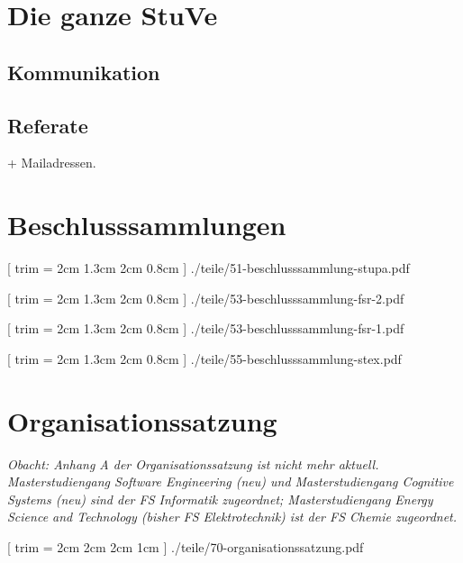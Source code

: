 \documentclass[
	10pt,
	a5paper,
	twoside
	]
	{book}
\begin{document}
\chapter{Die ganze StuVe}

\clearpage

\section{Kommunikation}

\section{Referate}

+ Mailadressen.

\null
\cleardoublepage
\null
\cleardoublepage

\chapter{Beschlusssammlungen}


\clearpage


%
%


	[
		trim = 2cm 1.3cm 2cm 0.8cm
	]
	{./teile/51-beschlusssammlung-stupa.pdf}


[
trim = 2cm 1.3cm 2cm 0.8cm
]
{./teile/53-beschlusssammlung-fsr-2.pdf}


[
trim = 2cm 1.3cm 2cm 0.8cm
]
{./teile/53-beschlusssammlung-fsr-1.pdf}


	[
		trim = 2cm 1.3cm 2cm 0.8cm
	]
	{./teile/55-beschlusssammlung-stex.pdf}


\chapter{Organisationssatzung}

\textit{Obacht: Anhang A der Organisationssatzung ist nicht mehr aktuell. Masterstudiengang Software Engineering (neu) und Masterstudiengang Cognitive Systems (neu) sind der FS Informatik zugeordnet; Masterstudiengang Energy Science and Technology (bisher FS Elektrotechnik) ist der FS Chemie zugeordnet.}

\clearpage


	[
		trim = 2cm 2cm 2cm 1cm
	]
	{./teile/70-organisationssatzung.pdf}
\end{document}

